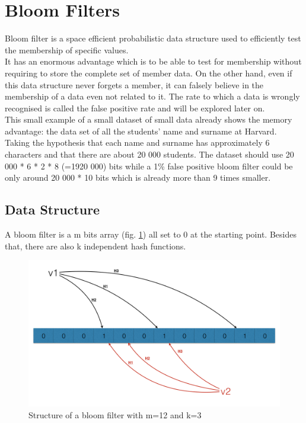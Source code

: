 \documentclass{eplmastersthesis}
\begin{document}
\section{Bloom Filters}
Bloom filter is a space efficient probabilistic data structure  used to efficiently test the membership of specific values.\\
It has an enormous advantage which is to be able to test for membership without requiring to store the complete set of member data. On the other hand, even if this data structure never forgets a member, it can falsely believe in the membership of a data even not related to it. The rate to which a data is wrongly recognised is called the false positive rate and will be explored later on.\\
This small example of a small dataset of small data already shows the memory advantage: the data set of all the students' name and surname at Harvard. Taking the hypothesis that each name and surname has approximately 6 characters and that there are about 20 000 students. The dataset should use 20 000 * 6 * 2 * 8 (=1920 000) bits while a 1\% false positive bloom filter could be only around 20 000 * 10 bits which is already more than 9 times smaller.\\

\subsection{Data Structure}
A bloom filter is a m bits array (fig. \ref{bloom-1}) all set to 0 at the starting point. Besides that, there are also k independent hash functions. 

\begin{figure}[h!]
	\begin{center}
		\includegraphics[scale=0.3]{res/bloom-1}
		\caption{Structure of a bloom filter with m=12 and k=3}
		\label{bloom-1}
	\end{center}
\end{figure}
\end{document}
